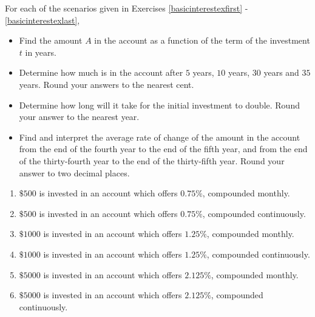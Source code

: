 For each of the scenarios given in Exercises \ref{basicinterestexfirst} - \ref{basicinterestexlast}, 

\begin{itemize}

\item  Find the amount $A$ in the account as a function of the term of the investment $t$ in years. 

\item  Determine how much is in the account after $5$ years, $10$ years, $30$ years and $35$ years.  Round your answers to the nearest cent.

\item  Determine how long will it take for the initial investment to double.  Round your answer to the nearest year.

\item  Find and interpret the average rate of change of the amount in the account from the end of
the fourth year to the end of the fifth year, and from the end of the thirty-fourth year to the
end of the thirty-fifth year.  Round your answer to two decimal places.

\end{itemize} 

\begin{enumerate}

\item  $\$500$ is invested in an account which offers $0.75 \%$, compounded monthly. \label{basicinterestexfirst}

\item  $\$500$ is invested in an account which offers $0.75 \%$, compounded continuously.

\item  $\$1000$ is invested in an account which offers $1.25 \%$, compounded monthly.

\item  $\$1000$ is invested in an account which offers $1.25 \%$, compounded continuously.

\item  $\$5000$ is invested in an account which offers $2.125 \%$, compounded monthly.

\item  $\$5000$ is invested in an account which offers $2.125 \%$, compounded continuously. \label{basicinterestexlast}

\setcounter{HW}{\value{enumi}}
\end{enumerate}

